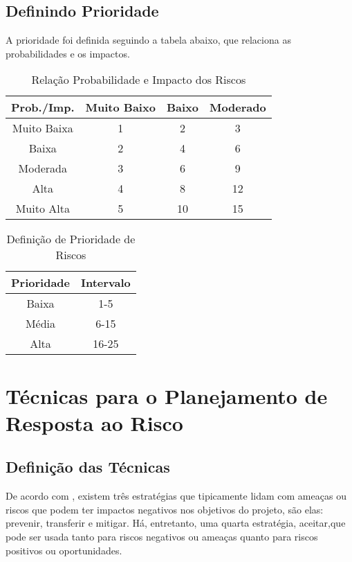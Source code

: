 \subsection{Definindo Prioridade}
A prioridade foi definida seguindo a tabela abaixo, que relaciona as probabilidades e os impactos.

\begin{table}[h]
\centering
\caption{Relação Probabilidade e Impacto dos Riscos}
\begin{tabular}{|c|c|c|c|}
\hline
\textbf{Prob./Imp.} & \textbf{Muito Baixo} & \textbf{Baixo} & \textbf{Moderado} \\ \hline
Muito Baixa         & 1                    & 2              & 3                 \\ \hline
Baixa               & 2                    & 4              & 6                 \\ \hline
Moderada            & 3                    & 6              & 9                 \\ \hline
Alta                & 4                    & 8              & 12                \\ \hline
Muito Alta          & 5                    & 10             & 15                \\ \hline
\end{tabular}
\end{table}

\begin{table}[h]
\centering
\caption{Definição de Prioridade de Riscos}
\label{my-label}
\begin{tabular}{|c|c|}
\hline
\textbf{Prioridade} & \textbf{Intervalo} \\ \hline
Baixa               & 1-5                \\ \hline
Média               & 6-15               \\ \hline
Alta                & 16-25              \\ \hline
\end{tabular}
\end{table}

\pagebreak


\section{Técnicas para o Planejamento de Resposta ao Risco}
\subsection{Definição das Técnicas}
De acordo com \cite{pmbok}, existem três estratégias que tipicamente lidam com ameaças ou riscos que podem ter impactos negativos nos objetivos do projeto, são elas:     prevenir, transferir e mitigar. Há, entretanto, uma quarta estratégia, aceitar,que pode ser usada tanto para riscos negativos ou ameaças quanto para riscos positivos ou oportunidades.

